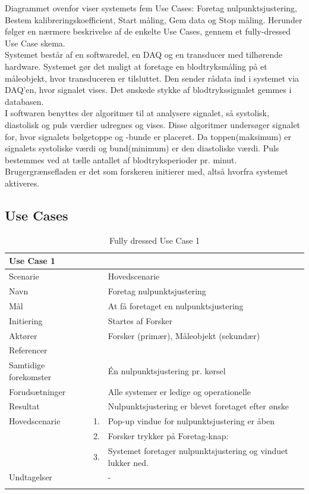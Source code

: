 Diagrammet ovenfor viser systemets fem Use Cases: Foretag nulpunktsjustering, Bestem kalibreringskoefficient, Start måling, Gem data og Stop måling. Herunder følger en nærmere beskrivelse af de enkelte Use Cases, gennem et fully-dressed Use Case skema. \\
\newline
Systemet består af en softwaredel, en DAQ og en transducer med tilhørende hardware. Systemet gør det muligt at foretage en blodtryksmåling på et måleobjekt, hvor transduceren er tilsluttet. Den sender rådata ind i systemet via DAQ'en, hvor signalet vises. Det ønskede stykke af blodtrykssignalet gemmes i databasen. \\
I softwaren benyttes der algoritmer til at analysere signalet, så systolisk, diastolisk og puls værdier udregnes og vises. Disse algoritmer undersøger signalet for, hvor signalets bølgetoppe og -bunde er placeret. Da toppen(maksimum) er signalets systoliske værdi og bund(minimum) er den diastoliske værdi. Puls bestemmes ved at tælle antallet af blodtryksperioder pr. minut. \\    
Brugergrænsefladen er det som forskeren initierer med, altså hvorfra systemet aktiveres.  

\subsection{Use Cases}

\begin{longtabu} to  %
	{\large \textbf{Use Case 1}} && \\
	\toprule
	Scenarie 				&&	Hovedscenarie\\
	Navn 					&& 	Foretag nulpunktsjustering\\
	Mål 					&& 	At få foretaget en nulpunktsjustering\\
	Initiering 				&& 	Startes af Forsker\\
	Aktører 				&& 	Forsker (primær), Måleobjekt (sekundær)\\
	Referencer 				&& 	\\
	Samtidige forekomster  	&& 	Én nulpunktsjustering pr. kørsel \\
	Forudsætninger 			&&	Alle systemer er ledige og operationelle\\ 
	Resultat 				&& 	Nulpunktsjustering er blevet foretaget efter ønske\\ \midrule
	Hovedscenarie 			&    1. 	&	Pop-up vindue for nulpunktsjustering er åben\\				 	
							&    2. 	& 	Forsker trykker på Foretag-knap:\\ 
							& 	 3.		&	 Systemet foretager nulpunktsjustering og vinduet lukker ned.\\[-1ex]
	Undtagelser 			&			& 	-  \\ \bottomrule
	
	\caption{Fully dressed Use Case 1}
	\label{UC1}
\end{longtabu}


